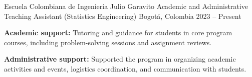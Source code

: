\begin{cventries}
  \vspace{0.6em}

  \cventry
    {Escuela Colombiana de Ingeniería Julio Garavito} %
    {Academic and Administrative Teaching Assistant (Statistics Engineering)} %
    {Bogotá, Colombia} %
    {2023 -- Present} %
    {
      \begin{cvitems}
        \item {\textbf{Academic support:} Tutoring and guidance for students in core program courses, including problem-solving sessions and assignment reviews.}
        \item {\textbf{Administrative support:} Supported the program in organizing academic activities and events, logistics coordination, and communication with students.}
      \end{cvitems}
    }

\end{cventries}
